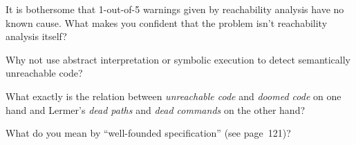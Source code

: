 \Q It is bothersome that 1-out-of-5 warnings given by reachability analysis
have no known cause. What makes you confident that the problem isn't
reachability analysis itself?

\Q Why not use abstract interpretation or symbolic execution to detect
semantically unreachable code?


\Q What exactly is the relation between {\it unreachable code\/} and {\it
doomed code\/} on one hand and Lermer's {\it dead paths\/} and {\it dead
commands\/} on the other hand?

\Q What do you mean by ``well-founded specification'' (see page~121)?

\bye
